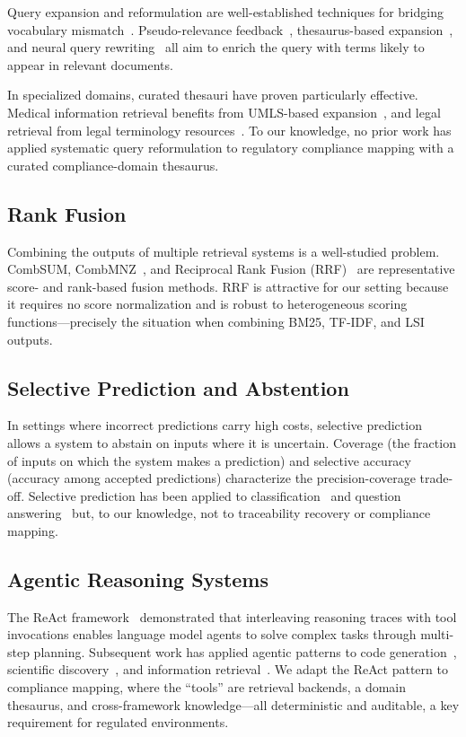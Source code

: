 \documentclass{sn-jnl}
\begin{document}
Query expansion and reformulation are well-established techniques for bridging vocabulary mismatch~\cite{Carpineto2012}.
Pseudo-relevance feedback~\cite{Rocchio1971}, thesaurus-based expansion~\cite{Voorhees1994}, and neural query rewriting~\cite{Nogueira2019} all aim to enrich the query with terms likely to appear in relevant documents.

In specialized domains, curated thesauri have proven particularly effective.
Medical information retrieval benefits from UMLS-based expansion~\cite{Aronson2010}, and legal retrieval from legal terminology resources~\cite{Maxwell2017}.
To our knowledge, no prior work has applied systematic query reformulation to regulatory compliance mapping with a curated compliance-domain thesaurus.

\subsection{Rank Fusion}

Combining the outputs of multiple retrieval systems is a well-studied problem.
CombSUM, CombMNZ~\cite{Fox1994}, and Reciprocal Rank Fusion (RRF)~\cite{Cormack2009} are representative score- and rank-based fusion methods.
RRF is attractive for our setting because it requires no score normalization and is robust to heterogeneous scoring functions---precisely the situation when combining BM25, TF-IDF, and LSI outputs.

\subsection{Selective Prediction and Abstention}

In settings where incorrect predictions carry high costs, selective prediction~\cite{ElYaniv2010,Geifman2017} allows a system to abstain on inputs where it is uncertain.
Coverage (the fraction of inputs on which the system makes a prediction) and selective accuracy (accuracy among accepted predictions) characterize the precision-coverage trade-off.
Selective prediction has been applied to classification~\cite{Geifman2019} and question answering~\cite{Kamath2020} but, to our knowledge, not to traceability recovery or compliance mapping.

\subsection{Agentic Reasoning Systems}

The ReAct framework~\cite{Yao2023} demonstrated that interleaving reasoning traces with tool invocations enables language model agents to solve complex tasks through multi-step planning.
Subsequent work has applied agentic patterns to code generation~\cite{Yang2024}, scientific discovery~\cite{Bran2024}, and information retrieval~\cite{Shao2024}.
We adapt the ReAct pattern to compliance mapping, where the ``tools'' are retrieval backends, a domain thesaurus, and cross-framework knowledge---all deterministic and auditable, a key requirement for regulated environments.
\end{document}
